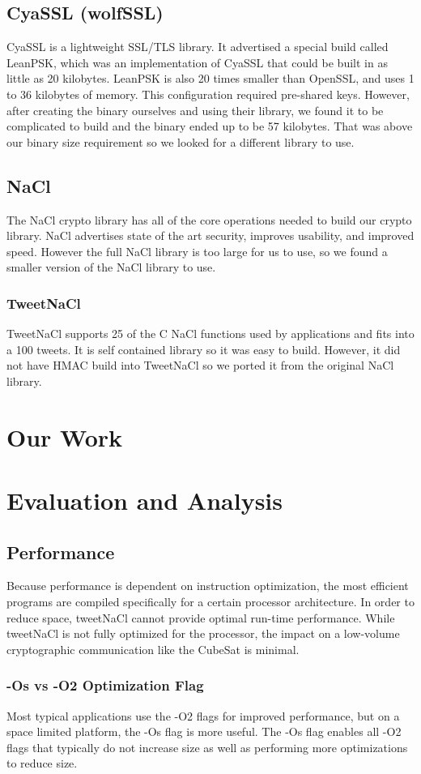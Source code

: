 \documentclass[12pt]{article}
\begin{document}
\begin{multicols}{2}
\subsection{CyaSSL (wolfSSL)}
CyaSSL is a lightweight SSL/TLS library. It advertised a special build called LeanPSK, which was an implementation of CyaSSL that could be built in as little as 20 kilobytes. LeanPSK is also 20 times smaller than OpenSSL, and uses 1 to 36 kilobytes of memory. This configuration required pre-shared keys. However, after creating the binary ourselves and using their library, we found it to be complicated to build and the binary ended up to be 57 kilobytes. That was above our binary size requirement so we looked for a different library to use. 
\subsection{NaCl}
The NaCl crypto library has all of the core operations needed to build our crypto library. NaCl advertises state of the art security, improves usability, and improved speed. However the full NaCl library is too large for us to use, so we found a smaller version of the NaCl library to use.
\subsubsection{TweetNaCl}
TweetNaCl supports 25 of the C NaCl functions used by applications and fits into a 100 tweets. It is self contained library so it was easy to build. However, it did not have HMAC build into TweetNaCl so we ported it from the original NaCl library.
\section{Our Work}
\section{Evaluation and Analysis}
\subsection{Performance}
Because performance is dependent on instruction optimization, the most efficient programs are compiled specifically for a certain processor architecture. In order to reduce space, tweetNaCl cannot provide optimal run-time performance. \cite{TweetNaCl} While tweetNaCl is not fully optimized for the processor, the impact on a low-volume cryptographic communication like the CubeSat is minimal.
\subsubsection{-Os vs -O2 Optimization Flag}
Most typical applications use the -O2 flags for improved performance, but on a space limited platform, the -Os flag is more useful. The -Os flag enables all -O2 flags that typically do not increase size as well as performing more optimizations to reduce size. \cite{GCC} 

\end{multicols}
\end{document}
